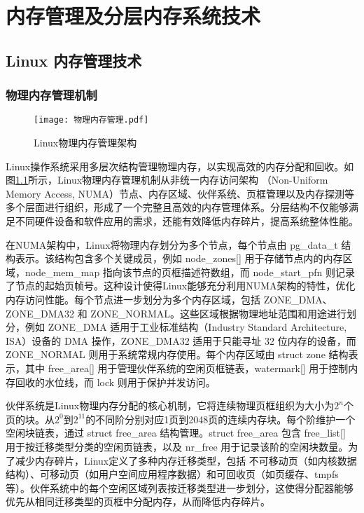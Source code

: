 \chapter{内存管理及分层内存系统技术}

\section{Linux 内存管理技术}

\subsection{物理内存管理机制}

\begin{figure}[htb]
    \centering
    \texttt{[image: 物理内存管理.pdf]}
    \caption{Linux物理内存管理架构}
    \label{物理内存管理}
\end{figure}

Linux操作系统采用多层次结构管理物理内存，以实现高效的内存分配和回收。如图\ref{物理内存管理}所示，Linux物理内存管理机制从非统一内存访问架构 （Non-Uniform Memory Access, NUMA）节点、内存区域、伙伴系统、页框管理以及内存探测等多个层面进行组织，形成了一个完整且高效的内存管理体系。分层结构不仅能够满足不同硬件设备和软件应用的需求，还能有效降低内存碎片，提高系统整体性能。

在NUMA架构中，Linux将物理内存划分为多个节点，每个节点由 pg\_data\_t 结构表示。该结构包含多个关键成员，例如 node\_zones[] 用于存储节点内的内存区域，node\_mem\_map 指向该节点的页框描述符数组，而 node\_start\_pfn 则记录了节点的起始页帧号。这种设计使得Linux能够充分利用NUMA架构的特性，优化内存访问性能。每个节点进一步划分为多个内存区域，包括 ZONE\_DMA、ZONE\_DMA32 和 ZONE\_NORMAL。这些区域根据物理地址范围和用途进行划分，例如 ZONE\_DMA 适用于工业标准结构（Industry Standard Architecture, ISA）设备的 DMA 操作，ZONE\_DMA32 适用于只能寻址 32 位内存的设备，而 ZONE\_NORMAL 则用于系统常规内存使用。每个内存区域由 struct zone 结构表示，其中 free\_area[] 用于管理伙伴系统的空闲页框链表，watermark[] 用于控制内存回收的水位线，而 lock 则用于保护并发访问。

伙伴系统是Linux物理内存分配的核心机制，它将连续物理页框组织为大小为\(2^n\)个页的块。从\(2^0\)到\(2^{11}\)的不同阶分别对应1页到2048页的连续内存块。每个阶维护一个空闲块链表，通过 struct free\_area 结构管理。struct free\_area 包含 free\_list[] 用于按迁移类型分类的空闲页链表，以及 nr\_free 用于记录该阶的空闲块数量。为了减少内存碎片，Linux定义了多种内存迁移类型，包括 不可移动页（如内核数据结构）、可移动页（如用户空间应用程序数据）和可回收页（如页缓存、tmpfs等）。伙伴系统中的每个空闲区域列表按迁移类型进一步划分，这使得分配器能够优先从相同迁移类型的页框中分配内存，从而降低内存碎片。

